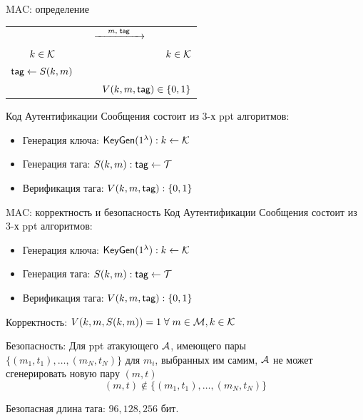 \documentclass[usenames,dvipsnames,8pt,aspectratio=169]{beamer}
\begin{document}
\begin{frame}{MAC: определение}
\begin{center}
\begin{tabular}{c c c c c}
		&  & \Huge $\xrightarrow{\mkern25mu m, \; \textsf{tag} \mkern25mu}$ & &  \\ 
		\LARGE $k \in \mathcal{K}$ &   & &  & $k \in \mathcal{K}$ \\[10pt]
		$\textsf{tag} \leftarrow S(k,m)$   & & &  &    \\ [20pt] 
		\multicolumn{5}{r}{$V(k,m, \textsf{tag}) \in \{ 0, 1\}$ }  \\
	\end{tabular}
\end{center}
\pause
\large
{\color{Orange} Код Аутентификации Сообщения } состоит из 3-х ppt алгоритмов:
\vspace{-2pt}
\begin{itemize}
	\item Генерация ключа: $\textsf{KeyGen}(1^\lambda): k \leftarrow \mathcal{K}$ \\[4pt]
	\item Генерация тага: $S(k, m): \textsf{tag} \leftarrow \mathcal{T}$ \\[4pt]
	\item Верификация тага: $V(k, m, \textsf{tag}): \{0, 1\}  $
\end{itemize}
\end{frame}

\begin{frame}{MAC: корректность и безопасность}
\Large
{\color{Orange} Код Аутентификации Сообщения } состоит из 3-х ppt алгоритмов:
\vspace{-2pt}
\begin{itemize}
	\item Генерация ключа: $\textsf{KeyGen}(1^\lambda): k \leftarrow \mathcal{K}$ \\[4pt]
	\item Генерация тага: $S(k, m): \textsf{tag} \leftarrow \mathcal{T}$ \\[4pt]
	\item Верификация тага: $V(k, m, \textsf{tag}): \{0, 1\}  $
\end{itemize}

\vspace{10pt}
{\color{Orange} Корректность:} \LARGE 
$ V(k, m, S(k,m)) = 1 \; \forall \; m \in \mathcal{M}, k \in \mathcal{K} $

\vspace{10pt}
{\color{Orange}Безопасность:}
Для ppt атакующего $\mathcal{A}$, имеющего пары $\{(m_1, t_1), \ldots, (m_N, t_N) \}$ для $m_i$, выбранных им самим, $\mathcal{A}$ не может сгенерировать новую пару  $(m,t)$
\[(m,t) \notin \{(m_1, t_1), \ldots, (m_N, t_N) \}\]

\vspace{10pt}

Безопасная длина тага: $96, 128, 256 $ бит.
\end{frame}
\end{document}
